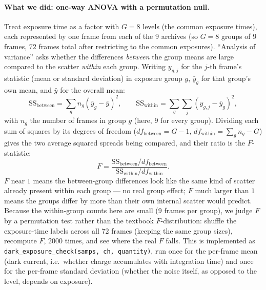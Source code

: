 \documentclass[11pt,a4paper]{article}
\newcommand{\code}[1]{\texttt{#1}}
\begin{document}
\paragraph{What we did: one-way ANOVA with a permutation null.}
Treat exposure time as a factor with $G = 8$ levels (the common exposure
times), each represented by one frame from each of the 9 archives (so
$G=8$ groups of $9$ frames, $72$ frames total after restricting to the
common exposures). ``Analysis of variance'' asks whether the differences
\emph{between} the group means are large compared to the scatter
\emph{within} each group. Writing $y_{g,j}$ for the $j$-th frame's
statistic (mean or standard deviation) in exposure group $g$, $\bar y_g$
for that group's own mean, and $\bar y$ for the overall mean:
\[
\mathrm{SS}_{\mathrm{between}} = \sum_{g} n_g (\bar y_g - \bar y)^2, \qquad
\mathrm{SS}_{\mathrm{within}} = \sum_{g}\sum_{j} (y_{g,j} - \bar y_g)^2,
\]
with $n_g$ the number of frames in group $g$ (here, $9$ for every group).
Dividing each sum of squares by its degrees of freedom ($df_{\mathrm{between}}
= G - 1$, $df_{\mathrm{within}} = \sum_g n_g - G$) gives the two average
squared spreads being compared, and their ratio is the $F$-statistic:
\[
F = \frac{\mathrm{SS}_{\mathrm{between}}/df_{\mathrm{between}}}
         {\mathrm{SS}_{\mathrm{within}}/df_{\mathrm{within}}}.
\]
$F$ near $1$ means the between-group differences look like the same kind of
scatter already present within each group --- no real group effect; $F$
much larger than $1$ means the groups differ by more than their own
internal scatter would predict. Because the within-group counts here are
small (9 frames per group), we judge $F$ by a permutation test rather than
the textbook $F$-distribution: shuffle the exposure-time labels across all
72 frames (keeping the same group sizes), recompute $F$, $2000$ times, and
see where the real $F$ falls. This is implemented as
\code{dark\_exposure\_check(samps, ch, quantity)}, run once for the
per-frame mean (dark current, i.e.\ whether charge accumulates with
integration time) and once for the per-frame standard deviation (whether
the noise itself, as opposed to the level, depends on exposure).
\end{document}
